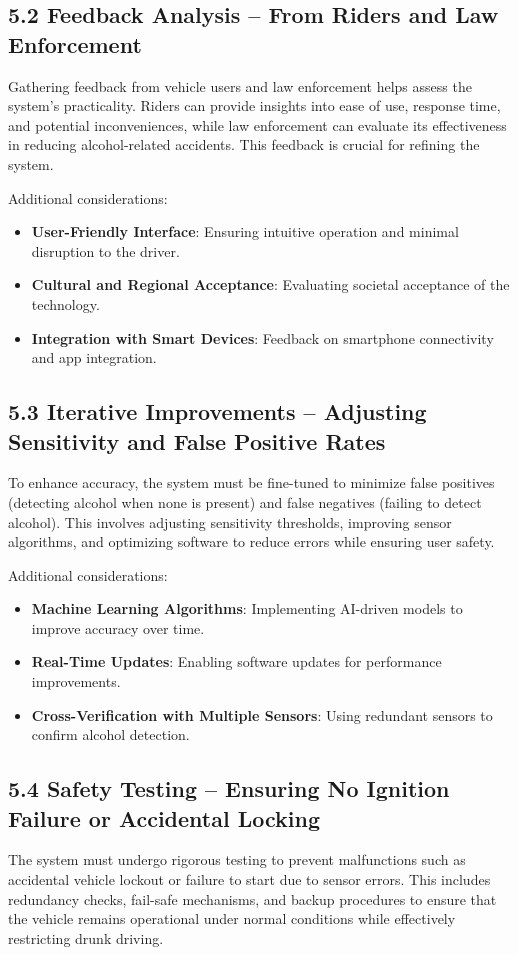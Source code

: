 \documentclass{article}
\begin{document}
\subsection {5.2 Feedback Analysis – From Riders and Law Enforcement}
Gathering feedback from vehicle users and law enforcement helps assess the system’s practicality. Riders can provide insights into ease of use, response time, and potential inconveniences, while law enforcement can evaluate its effectiveness in reducing alcohol-related accidents. This feedback is crucial for refining the system.

Additional considerations:
\begin{itemize}
    \item \textbf{User-Friendly Interface}: Ensuring intuitive operation and minimal disruption to the driver.
    \item \textbf{Cultural and Regional Acceptance}: Evaluating societal acceptance of the technology.
    \item \textbf{Integration with Smart Devices}: Feedback on smartphone connectivity and app integration.
\end{itemize}

\subsection {5.3 Iterative Improvements – Adjusting Sensitivity and False Positive Rates}
To enhance accuracy, the system must be fine-tuned to minimize false positives (detecting alcohol when none is present) and false negatives (failing to detect alcohol). This involves adjusting sensitivity thresholds, improving sensor algorithms, and optimizing software to reduce errors while ensuring user safety.

Additional considerations:
\begin{itemize}
    \item \textbf{Machine Learning Algorithms}: Implementing AI-driven models to improve accuracy over time.
    \item \textbf{Real-Time Updates}: Enabling software updates for performance improvements.
    \item \textbf{Cross-Verification with Multiple Sensors}: Using redundant sensors to confirm alcohol detection.
\end{itemize}

\subsection {5.4 Safety Testing – Ensuring No Ignition Failure or Accidental Locking}
The system must undergo rigorous testing to prevent malfunctions such as accidental vehicle lockout or failure to start due to sensor errors. This includes redundancy checks, fail-safe mechanisms, and backup procedures to ensure that the vehicle remains operational under normal conditions while effectively restricting drunk driving.
\end{document}
